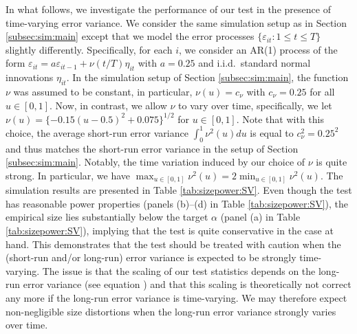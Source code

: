 \documentclass[12pt]{article}
\makeatletter
\renewcommand{\eqref}[1]{\tagform@{\ref{#1}}}
\makeatother
\begin{document}

% 
% 
% 


In what follows, we investigate the performance of our test in the presence of time-varying error variance. We consider the same simulation setup as in Section \ref{subsec:sim:main} except that we model the error processes $\{\varepsilon_{it}: 1 \le t \le T\}$ slightly differently. Specifically, for each $i$, we consider an AR(1) process of the form $\varepsilon_{it} = a \varepsilon_{i t-1} + \nu(t/T)\eta_{it}$ with $a = 0.25$ and i.i.d.\ standard normal innovations $\eta_{it}$. In the simulation setup of Section \ref{subsec:sim:main}, the function $\nu$ was assumed to be constant, in particular, $\nu(u) = c_\nu$ with $c_\nu = 0.25$ for all $u \in [0,1]$. Now, in contrast, we allow $\nu$ to vary over time, specifically, we let $\nu(u) = \{ -0.15(u-0.5)^2 + 0.075 \}^{1/2}$ for $u \in [0, 1]$. Note that with this choice, the average short-run error variance $\int_0^1 \nu^2(u)du$ is equal to $c_\nu^2 = 0.25^2$ and thus matches the short-run error variance in the setup of Section \ref{subsec:sim:main}. Notably, the time variation induced by our choice of $\nu$ is quite strong. In particular, we have $\max_{u \in [0,1]} \nu^2(u) = 2 \min_{u \in [0,1]} \nu^2(u)$. 
The simulation results are presented in Table \ref{tab:sizepower:SV}. Even though the test has reasonable power properties (panels (b)--(d) in Table \ref{tab:sizepower:SV}), the empirical size lies substantially below the target $\alpha$ (panel (a) in Table \ref{tab:sizepower:SV}), implying that the test is quite conservative in the case at hand. This demonstrates that the test should be treated with caution when the (short-run and/or long-run) error variance is expected to be strongly time-varying. The issue is that the scaling of our test statistics depends on the long-run error variance (see equation \eqref{eq:psi_zero_ij}) and that this scaling is theoretically not correct any more if the long-run error variance is time-varying. We may therefore expect non-negligible size distortions when the long-run error variance strongly varies over time. 
\end{document}
